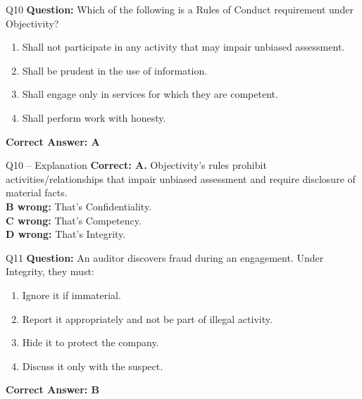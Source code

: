 \documentclass[aspectratio=169,10pt]{beamer}
\begin{document}
	\begin{frame}[t]{Q10}
		\small
		\textbf{Question:} Which of the following is a Rules of Conduct requirement under Objectivity?
		\begin{enumerate}[label=\Alph*.,itemsep=1pt,topsep=2pt]
			\item Shall not participate in any activity that may impair unbiased assessment.
			\item Shall be prudent in the use of information.
			\item Shall engage only in services for which they are competent.
			\item Shall perform work with honesty.
		\end{enumerate}
		\vspace{4pt}
		\textbf{Correct Answer: A}
	\end{frame}
	
	\begin{frame}[t]{Q10 -- Explanation}
		\small
		\textbf{Correct: A.} Objectivity's rules prohibit activities/relationships that impair unbiased assessment and require disclosure of material facts. \\[4pt]
		\textbf{B wrong:} That's Confidentiality. \\[2pt]
		\textbf{C wrong:} That's Competency. \\[2pt]
		\textbf{D wrong:} That's Integrity.
	\end{frame}
	
	\begin{frame}[t]{Q11}
		\small
		\textbf{Question:} An auditor discovers fraud during an engagement. Under Integrity, they must:
		\begin{enumerate}[label=\Alph*.,itemsep=1pt,topsep=2pt]
			\item Ignore it if immaterial.
			\item Report it appropriately and not be part of illegal activity.
			\item Hide it to protect the company.
			\item Discuss it only with the suspect.
		\end{enumerate}
		\vspace{4pt}
		\textbf{Correct Answer: B}
	\end{frame}
	
\end{document}
